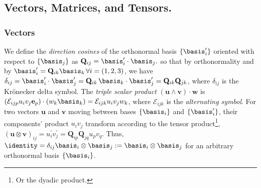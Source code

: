 \subsection{Vectors, Matrices, and Tensors.}
%
\subsubsection{Vectors} We define the \textit{direction cosines} of the orthonormal basis $\{\basis_i^\prime\}$ oriented with respect to $\{\mathbf{\basis}_j\}$ as $ \mathbf{Q}_{ij} = \mathbf{\basis}_i^\prime \cdot \mathbf{\basis}_j.$
%
%
so that by orthonormality and by $\basis_i^\prime = \mathbf{Q}_{ik} \basis_k \, \forall i=(1, 2, 3)$, we have  $\delta_{ij} = \basis_i^\prime \cdot \basis_j^\prime = \mathbf{Q}_{ik} \, \basis_k \cdot \basis_j^\prime = \mathbf{Q}_{ik} \mathbf{Q}_{jk}$, where $\delta_{ij}$ is the Kr\"{o}necker delta symbol.
%
%
%
The \textit{triple scalar product}  $\left( \mathbf{u} \wedge \mathbf{v} \right) \cdot \mathbf{w}$ is $\left(\mathcal{E}_{ijp} u_i v_j \mathbf{e}_p \right) \cdot \left( w_k \basis_k \right) = \mathcal{E}_{ijk} u_i v_j w_k$, where $\mathcal{E}_{ijk}$ is the \textit{alternating symbol}.
%
%
For two vectors $\mathbf{u}$ and $\mathbf{v}$ moving between bases $\{\basis_i\}$ and $\{\basis_i^\prime\}$, their components' product $u_i v_j$ transform according to the tensor product\footnote{Or the dyadic product.}, $(\mathbf{u} \otimes \mathbf{v})_{ij} = u_i^\prime v_j^\prime = \mathbf{Q}_{ip} \mathbf{Q}_{jq} u_p v_q$. Thus, $\identity = \delta_{ij} \basis_i \otimes \basis_j:= \basis_i \otimes \basis_j$ for an arbitrary orthonormal basis $\{\basis_i \}$.
